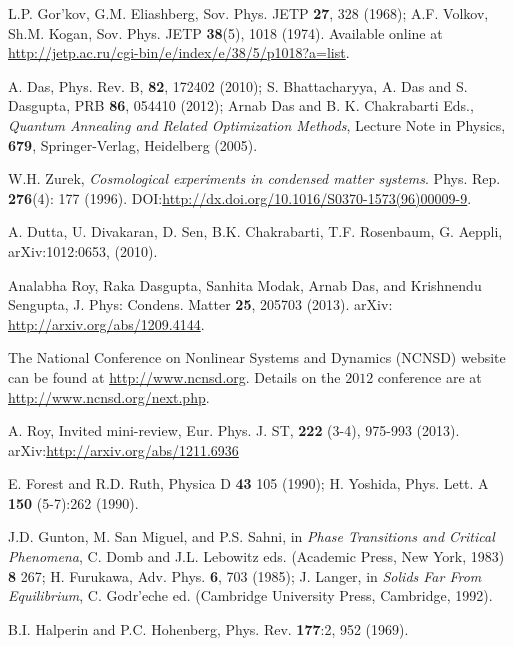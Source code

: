 \documentclass[a4paper,10pt]{report}
\begin{document}
\begin{thebibliography}{10}

L.P. Gor’kov, G.M. Eliashberg, Sov. Phys. JETP \textbf{27}, 328 (1968);
A.F. Volkov, Sh.M. Kogan, Sov. Phys. JETP \textbf{38}(5), 1018 (1974). Available online at \url{http://jetp.ac.ru/cgi-bin/e/index/e/38/5/p1018?a=list}.

 A. Das, Phys. Rev. B, {\bf 82}, 172402 (2010); S. Bhattacharyya, A. Das and S. Dasgupta, PRB {\bf 86}, 054410 (2012); Arnab Das and B. K. Chakrabarti Eds., \textit{Quantum Annealing and Related Optimization Methods}, Lecture Note in Physics, {\bf 679}, Springer-Verlag, Heidelberg (2005).

\newblock W.H. Zurek, 
\newblock\textit{Cosmological experiments in condensed matter systems}. 
\newblock Phys. Rep. {\bf 276}(4): 177 (1996).
\newblock DOI:\url{http://dx.doi.org/10.1016/S0370-1573(96)00009-9}.

A. Dutta, U. Divakaran, D. Sen, B.K. Chakrabarti, T.F. Rosenbaum, G. Aeppli, arXiv:1012:0653, (2010).

\newblock Analabha Roy, Raka Dasgupta, Sanhita Modak, Arnab Das, and Krishnendu Sengupta, 
\newblock  J. Phys: Condens. Matter {\bf 25}, 205703 (2013).
\newblock arXiv: \url{http://arxiv.org/abs/1209.4144}.

The National Conference on Nonlinear Systems and Dynamics (NCNSD) website can be found at \url{http://www.ncnsd.org}. Details on the $2012$ conference are at \url{http://www.ncnsd.org/next.php}.

\newblock A. Roy, 
\newblock Invited mini-review, 
\newblock Eur. Phys. J. ST, {\bf 222} (3-4), 975-993 (2013). 
\newblock arXiv:\url{http://arxiv.org/abs/1211.6936}

E. Forest and R.D. Ruth, Physica D {\bf 43} 105 (1990); H. Yoshida, Phys. Lett. A {\bf 150} (5-7):262 (1990).

J.D. Gunton, M. San Miguel, and P.S. Sahni, in \textit{Phase Transitions and Critical Phenomena}, C. Domb
and J.L. Lebowitz eds. (Academic Press, New York, 1983)  {\bf 8} 267; H. Furukawa, Adv. Phys. {\bf 6}, 703 (1985);
J. Langer, in \textit{Solids Far From Equilibrium}, C. Godr'eche ed. (Cambridge University Press, Cambridge, 1992).

B.I. Halperin and P.C. Hohenberg, Phys. Rev. {\bf 177}:2, 952 (1969).


\end{thebibliography}
\end{document}
